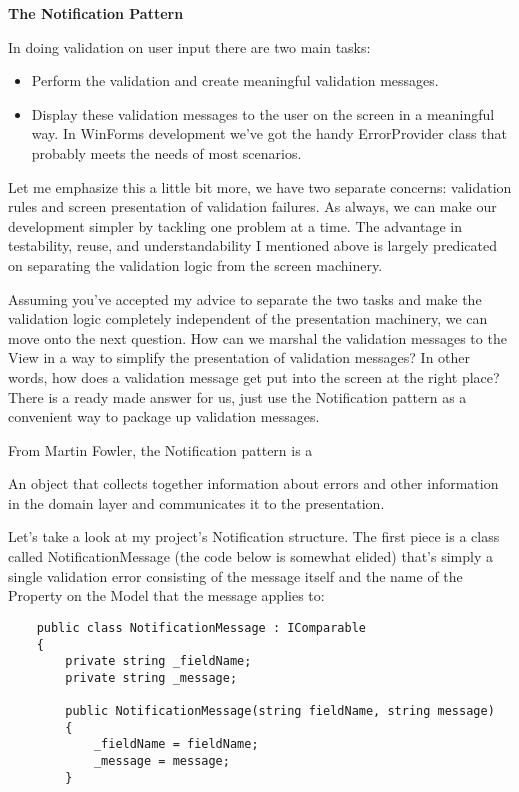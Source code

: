 \documentclass{article}
\begin{document}
{ 
\Large {\textbf{The Notification Pattern}}

In doing validation on user input there are two main tasks:

\begin{itemize}
    \item  Perform the validation and create meaningful validation messages.
    \item  Display these validation messages to the user on the screen in a meaningful way.  In WinForms development we've got the handy ErrorProvider class that probably meets the needs of most scenarios.
\end{itemize}	

Let me emphasize this a little bit more, we have two separate concerns:  validation rules and screen presentation of validation failures.  As always, we can make our development simpler by tackling one problem at a time.  The advantage in testability, reuse, and understandability I mentioned above is largely predicated on separating the validation logic from the screen machinery. 

Assuming you've accepted my advice to separate the two tasks and make the validation logic completely independent of the presentation machinery, we can move onto the next question.  How can we marshal the validation messages to the View in a way to simplify the presentation of validation messages?  In other words, how does a validation message get put into the screen at the right place?  There is a ready made answer for us, just use the Notification pattern as a convenient way to package up validation messages.

From Martin Fowler, the Notification pattern is a

    An object that collects together information about errors and other information in the domain layer and communicates it to the presentation.

Let's take a look at my project's Notification structure.  The first piece is a class called NotificationMessage (the code below is somewhat elided) that's simply a single validation error consisting of the message itself and the name of the Property on the Model that the message applies to:
\newpage
\begin{lstlisting}
    public class NotificationMessage : IComparable
    {
        private string _fieldName;
        private string _message;

        public NotificationMessage(string fieldName, string message)
        {
            _fieldName = fieldName;
            _message = message;
        }


\end{lstlisting}}
\end{document}
